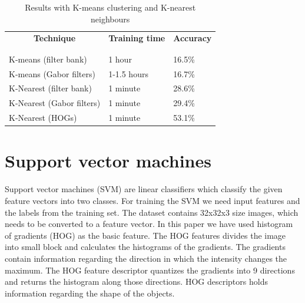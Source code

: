 \documentclass{article} %
\begin{document}
        \begin{table}[t]
            \begin{center}
                \begin{tabular}{lll}
                    \multicolumn{1}{c}{\bf Technique} &\multicolumn{1}{c}{\bf Training time} &\multicolumn{1}{c}{\bf Accuracy}\\
                    \\ \hline \\
                    K-means (filter bank) & 1 hour& 16.5\% \\
                    K-means (Gabor filters) &1-1.5 hours & 16.7\% \\
                    K-Nearest (filter bank) &1 minute& 28.6\% \\
                    K-Nearest (Gabor filters) &1 minute& 29.4\% \\
                    K-Nearest (HOGs) &1 minute& 53.1\% \\
                \end{tabular}
            \end{center}
            \caption{Results with K-means clustering and K-nearest neighbours}
            \label{tab:knn}
        \end{table}


\section{Support vector machines}
\label{sec:svm}
	Support vector machines (SVM) are linear classifiers which classify the given feature vectors into two classes. For training the SVM we need input features and the labels from the training set. The dataset contains 32x32x3 size images, which needs to be converted to a feature vector. In this paper we have used histogram of gradients (HOG) as the basic feature. The HOG features divides the image into small block and calculates the histograms of the gradients. The gradients contain information regarding the direction in which the intensity changes the maximum. The HOG feature descriptor quantizes the gradients into 9 directions and returns the histogram along those directions. HOG descriptors holds information regarding the shape of the objects.
	
\end{document}
